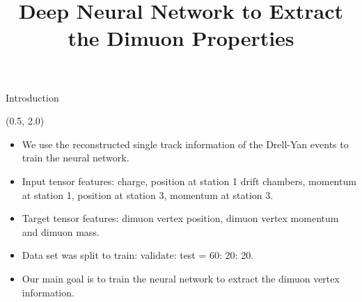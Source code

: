 \documentclass[12pt, xcolor={dvipsnames}, aspectratio = 169, sans,mathserif]{beamer}
\title{Deep Neural Network to Extract the Dimuon Properties}
\begin{document}
\begin{frame}
	\maketitle
\end{frame}

\begin{frame}[fragile]{Introduction}

\begin{textblock}{15.0}(0.5, 2.0)
\begin{itemize}

	\item We use the reconstructed single track information of the Drell-Yan events to train the neural network.

	\item Input tensor features: charge, position at station 1 drift chambers, momentum at station 1, position at station 3, momentum at station 3.

	\item Target tensor features: dimuon vertex position, dimuon vertex momentum and dimuon mass.

	\item Data set was split to train: validate: test = 60: 20: 20.

	\item Our main goal is to train the neural network to extract the dimuon vertex information.

\end{itemize}
\end{textblock}

\end{frame}
\end{document}
